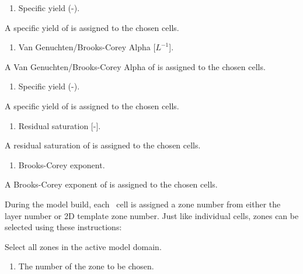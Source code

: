 {
    {
        \squish
        \begin{enumerate}
        \item {}  Specific yield (-).
        \end{enumerate}
          A specific yield of   is assigned to the chosen cells.
    }

    {
        \squish
        \begin{enumerate}
        \item {}  Van Genuchten/Brooks-Corey Alpha [$L^{-1}$].
        \end{enumerate}
          A Van Genuchten/Brooks-Corey Alpha of  is assigned to the chosen cells.
    }

    {
        \squish
        \begin{enumerate}
        \item {}  Specific yield (-).
        \end{enumerate}
          A specific yield of  is assigned to the chosen cells.
    }

    {
        \squish
        \begin{enumerate}
        \item {}  Residual saturation [-].
        \end{enumerate}
          A residual saturation of  is assigned to the chosen cells.
    }

    {
        \squish
        \begin{enumerate}
        \item {}  Brooks-Corey exponent.
        \end{enumerate}
          A Brooks-Corey exponent of  is assigned to the chosen cells.
    }

During the model build, each \gwf\ cell is assigned a zone number from either the layer number or 2D template zone number. Just like individual cells, zones can be selected using these instructions\label{page:zoneSelect}:

    {Select all zones in the active model domain.
     }

    {
        \squish
        \begin{enumerate}
        \item {}  The number of the zone to be chosen.
        \end{enumerate}
        \squish
    }

}
